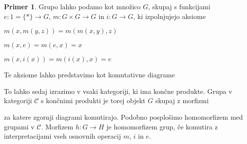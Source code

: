 \documentclass[12pt,a4paper]{book}
\theoremstyle{definition}
\theoremstyle{plain}
\theoremstyle{definition}
\newtheorem{primer}{Primer}[section]
\theoremstyle{remark}
\begin{document}
%
\begin{primer}
Grupo lahko podamo kot množico $G$, skupaj s funkcijami $e : 1 = \lbrace * \rbrace \to G$, $m : G \times G \to G$ in $i : G \to G$, ki izpolnjujejo aksiome
\begin{description}
\item $m(x,m(y,z)) = m(m(x,y),z)$
\item $m(x,e) = m(e,x) = x$
\item $m(x,i(x)) = m(i(x),x) = e$
\end{description}
\end{primer}
%
Te aksiome lahko predstavimo kot komutativne diagrame
\begin{center}
\end{center}
\begin{center}
\end{center}
\begin{center}
\end{center}
%
To lahko sedaj izrazimo v vsaki kategoriji, ki ima končne produkte.
%
Grupa v kategoriji $\mathcal{C}$ s končnimi produkti je torej objekt $G$ skupaj z morfizmi
\begin{center}
\end{center}
za katere zgornji diagrami komutirajo.
%
Podobno posplošimo homomorfizem med grupami v $\mathcal{C}$. Morfizem $h : G \to H$ je homomorfizem grup, če komutira z interpretacijami vseh osnovnih operacij $m$, $i$ in $e$.
\end{document}
